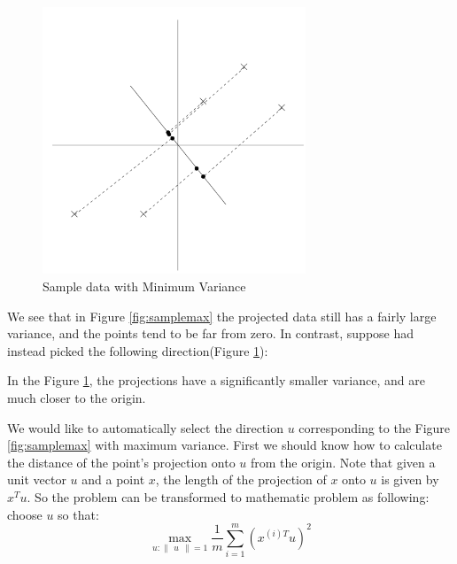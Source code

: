 \documentclass[a4paper]{article}
\begin{document}
\begin{figure}[h]
\centering
\includegraphics[width=0.7\textwidth]{./images/sample_min.png}
\caption{\label{fig:samplemin} Sample data with Minimum Variance}
\end{figure}

We see that in Figure \ref{fig:samplemax} the projected data still has a fairly large variance, and the points tend to be far from zero. In contrast, suppose had instead picked the following direction(Figure \ref{fig:samplemin}):

In the Figure \ref{fig:samplemin}, the projections have a significantly smaller variance, and are much closer to the origin.

We would like to automatically select the direction $u$ corresponding to the Figure \ref{fig:samplemax} with maximum variance.  First we should know how to calculate the distance of the point's projection onto $u$ from the origin. Note that given a unit vector $u$ and a point $x$, the length of the projection of $x$ onto $u$ is given by $x^{T}u$. So the problem can be transformed to mathematic problem as following: choose $u$ so that:
$$
	\max_{u:\begin{Vmatrix}u\end{Vmatrix}=1} \frac{1}{m} \sum_{i=1}^{m}(x^{(i)T}u)^{2}
$$
\end{document}
